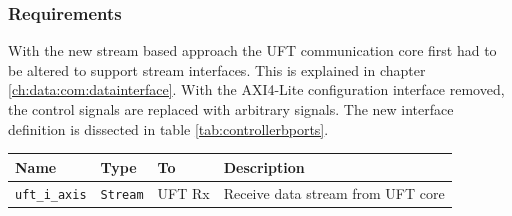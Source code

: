 \subsubsection*{Requirements}
With the new stream based approach the UFT communication core first had to be
altered to support stream interfaces. This is explained in chapter 
\ref{ch:data:com:datainterface}. With the AXI4-Lite configuration interface
removed, the
control signals are replaced with arbitrary signals. The new interface
definition is dissected in table \ref{tab:controllerbports}.

\begin{table}[t!]
    \centering
    \begin{tabular}{l l l p{8cm}}
        \toprule
        Name & Type & To & Description \\
        \midrule
        \texttt{uft\_i\_axis} & \texttt{Stream} & UFT Rx &
        Receive data stream from UFT core
        \\


\end{tabular}
\end{table}
